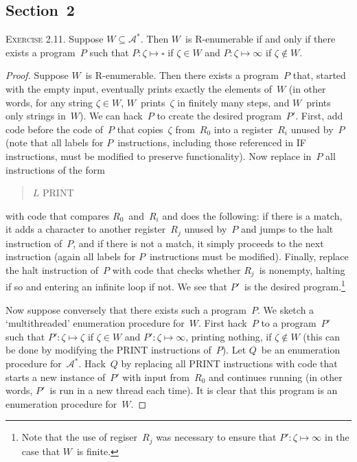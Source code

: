 \documentclass[letterpaper]{article}
\theoremstyle{remark}
\begin{document}
\subsection*{Section~2}
\noindent\textsc{Exercise 2.11.}
Suppose $W\subseteq\mathcal{A}^*$. Then $W$~is R-enumerable if and only if there exists a program~$P$ such that $P:\zeta\mapsto\square$ if $\zeta\in W$ and $P:\zeta\mapsto\infty$ if $\zeta\not\in W$.
\begin{proof}
Suppose $W$~is R-enumerable. Then there exists a program~$P$ that, started with the empty input, eventually prints exactly the elements of~$W$ (in other words, for any string $\zeta\in W$, $W$~prints~$\zeta$ in finitely many steps, and $W$~prints only strings in~$W$). We can hack~$P$ to create the desired program~$P'$. First, add code before the code of~$P$ that copies~$\zeta$ from~$R_0$ into a register~$R_i$ unused by~$P$ (note that all labels for $P$~instructions, including those referenced in IF instructions, must be modified to preserve functionality). Now replace in~$P$ all instructions of the form
\begin{quote}
$L$ PRINT
\end{quote}
with code that compares $R_0$~and~$R_i$ and does the following: if there is a match, it adds a character to another register~$R_j$ unused by~$P$ and jumps to the halt instruction of~$P$, and if there is not a match, it simply proceeds to the next instruction (again all labels for $P$~instructions must be modified). Finally, replace the halt instruction of~$P$ with code that checks whether $R_j$~is nonempty, halting if so and entering an infinite loop if not. We see that $P'$~is the desired program.\footnote{Note that the use of regiser~$R_j$ was necessary to ensure that $P':\zeta\mapsto\infty$ in the case that $W$~is finite.}

Now suppose conversely that there exists such a program~$P$. We sketch a `multithreaded' enumeration procedure for~$W$. First hack~$P$ to a program~$P'$ such that $P':\zeta\mapsto\zeta$ if $\zeta\in W$ and $P':\zeta\mapsto\infty$, printing nothing, if $\zeta\not\in W$ (this can be done by modifying the PRINT instructions of~$P$). Let $Q$~be an enumeration procedure for~$\mathcal{A}^*$. Hack~$Q$ by replacing all PRINT instructions with code that starts a new instance of~$P'$ with input from~$R_0$ and continues running (in other words, $P'$~is run in a new thread each time). It is clear that this program is an enumeration procedure for~$W$.
\end{proof}
\end{document}
